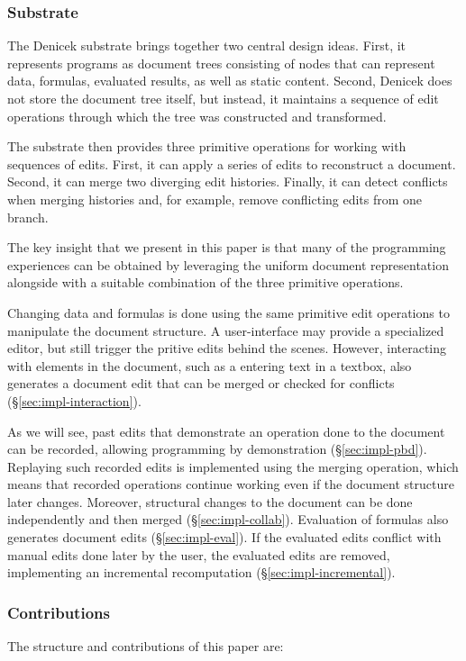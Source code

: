 \documentclass[sigconf,anonymous,screen]{acmart}
\begin{document}
\subsubsection*{Substrate}
The Denicek substrate brings together two central design ideas. First, it represents programs as
document trees consisting of nodes that can represent data, formulas, evaluated results, as well as
static content. Second, Denicek does not store the document tree itself, but instead, it maintains
a sequence of edit operations through which the tree was constructed and transformed.

The substrate then provides three primitive operations for working with sequences of edits.
First, it can apply a series of edits to reconstruct a document. Second, it can merge two
diverging edit histories. Finally, it can detect conflicts when merging histories and, for
example, remove conflicting edits from one branch.

The key insight that we present in this paper is that many of the programming experiences can
be obtained by leveraging the uniform document representation alongside with a suitable combination
of the three primitive operations.

Changing data and formulas is done using the same primitive edit operations to
manipulate the document structure. A user-interface may provide a specialized editor, but still
trigger the pritive edits behind the scenes. However, interacting with elements in the document,
such as a entering text in a textbox, also generates a document edit that can be merged or checked
for conflicts (\S\ref{sec:impl-interaction}).

As we will see, past edits that demonstrate an operation done to the
document can be recorded, allowing programming by demonstration (\S\ref{sec:impl-pbd}).  Replaying
such recorded edits is implemented using the merging operation, which means that recorded operations
continue working even if the document structure later changes. Moreover, structural changes to the
document can be done independently and then merged (\S\ref{sec:impl-collab}). Evaluation of formulas
also generates document edits (\S\ref{sec:impl-eval}). If the evaluated edits conflict with manual
edits done later by the user, the evaluated edits are removed, implementing an incremental
recomputation (\S\ref{sec:impl-incremental}).

\subsubsection*{Contributions}
The structure and contributions of this paper are:
\end{document}

